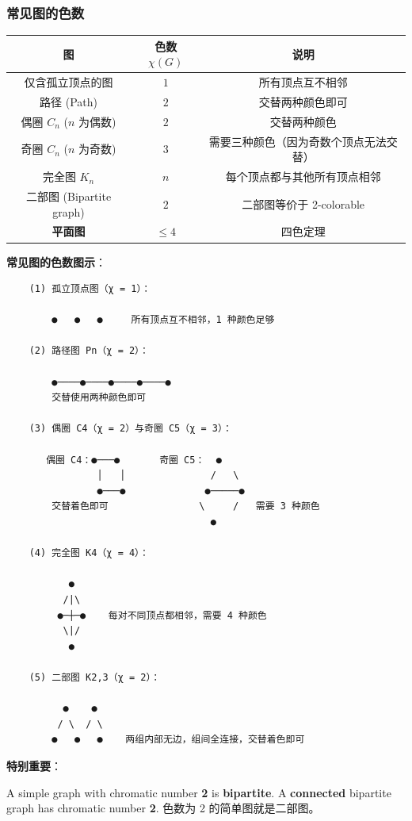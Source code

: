 \documentclass[10pt,a4paper,openany]{ctexbook}
\theoremstyle{definition}
\theoremstyle{remark}
\renewenvironment{quote}
  {\list{}{\leftmargin=1em\rightmargin=0pt\topsep=0.5pt\partopsep=0pt}\item[]}
  {\endlist}
\begin{document}
\subsubsection{常见图的色数}

\begin{center}
\begin{tabular}{ccc}
\hline
图 & 色数 $\chi(G)$ & 说明 \\ \hline
仅含孤立顶点的图 & $1$ & 所有顶点互不相邻 \\
路径 (Path) & $2$ & 交替两种颜色即可 \\
偶圈 $C_n$ ($n$ 为偶数) & $2$ & 交替两种颜色 \\
奇圈 $C_n$ ($n$ 为奇数) & $3$ & 需要三种颜色（因为奇数个顶点无法交替） \\
完全图 $K_n$ & $n$ & 每个顶点都与其他所有顶点相邻 \\
二部图 (Bipartite graph) & $2$ & 二部图等价于 2-colorable \\
\textbf{平面图} & $\le 4$ & 四色定理 \\
\hline
\end{tabular}

\end{center}

\textbf{常见图的色数图示}：
{\footnotesize\begin{verbatim}
    (1) 孤立顶点图（χ = 1）：
    
        ●   ●   ●     所有顶点互不相邻，1 种颜色足够
    
    (2) 路径图 Pn（χ = 2）：
    
        ●────●────●────●────●
        交替使用两种颜色即可
    
    (3) 偶圈 C4（χ = 2）与奇圈 C5（χ = 3）：
    
       偶圈 C4：●───●       奇圈 C5：  ●
                │   │               /   \
                ●───●              ●─────●
        交替着色即可                \     /   需要 3 种颜色
                                    ●
    
    (4) 完全图 K4（χ = 4）：
    
           ●
          /|\
         ●─┼─●    每对不同顶点都相邻，需要 4 种颜色
          \|/
           ●
    
    (5) 二部图 K2,3（χ = 2）：
    
          ●    ●
         / \  / \
        ●   ●   ●    两组内部无边，组间全连接，交替着色即可
\end{verbatim}}

\textbf{特别重要}：
\begin{quote}
A simple graph with chromatic number \textbf{2} is \textbf{bipartite}.
A \textbf{connected} bipartite graph has chromatic number \textbf{2}.
色数为 2 的简单图就是二部图。

\end{quote}
\vspace{-2pt}
\end{document}
